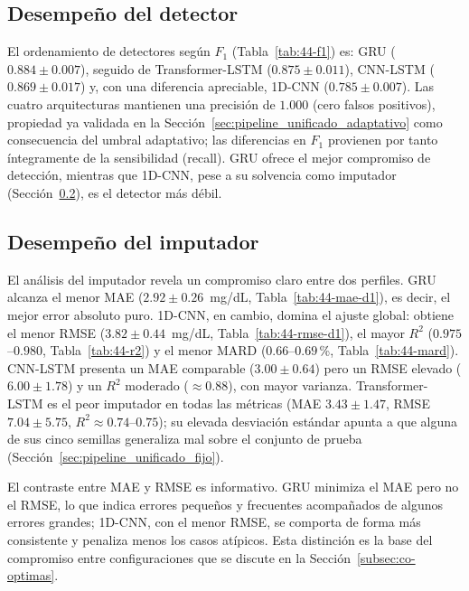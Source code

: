 \documentclass{report}
\begin{document}
\subsection{Desempeño del detector}
\label{subsec:detector-f1}

El ordenamiento de detectores según $F_1$ (Tabla~\ref{tab:44-f1}) es:
GRU ($0.884 \pm 0.007$), seguido de Transformer-LSTM ($0.875 \pm 0.011$),
CNN-LSTM ($0.869 \pm 0.017$) y, con una diferencia apreciable, 1D-CNN
($0.785 \pm 0.007$). Las cuatro arquitecturas mantienen una precisión de $1.000$ (cero falsos positivos), propiedad ya validada en la Sección~\ref{sec:pipeline_unificado_adaptativo} como consecuencia del umbral adaptativo; las diferencias en $F_1$ provienen por tanto íntegramente de la sensibilidad (recall). GRU ofrece el mejor compromiso de detección, mientras que 1D-CNN, pese a su solvencia como imputador (Sección~\ref{subsec:imputador}), es el detector más débil.

\subsection{Desempeño del imputador}
\label{subsec:imputador}

El análisis del imputador revela un compromiso claro entre dos perfiles. GRU alcanza el menor MAE ($2.92 \pm 0.26$~mg/dL, Tabla~\ref{tab:44-mae-d1}), es decir, el mejor error absoluto puro. 1D-CNN, en cambio, domina el ajuste global: obtiene el menor RMSE ($3.82 \pm 0.44$~mg/dL, Tabla~\ref{tab:44-rmse-d1}), el mayor $R^2$ ($0.975$–$0.980$, Tabla~\ref{tab:44-r2}) y el menor MARD ($0.66$–$0.69$\,\%, Tabla~\ref{tab:44-mard}). CNN-LSTM presenta un MAE comparable ($3.00 \pm 0.64$) pero un RMSE elevado ($6.00 \pm 1.78$) y un $R^2$ moderado ($\approx 0.88$), con mayor varianza. Transformer-LSTM es el peor imputador en todas las métricas (MAE $3.43 \pm 1.47$, RMSE $7.04 \pm 5.75$, $R^2 \approx 0.74$–$0.75$); su elevada desviación estándar apunta a que alguna de sus cinco semillas generaliza mal sobre el conjunto de prueba (Sección~\ref{sec:pipeline_unificado_fijo}).

El contraste entre MAE y RMSE es informativo. GRU minimiza el MAE pero no el RMSE, lo que indica errores pequeños y frecuentes acompañados de algunos errores grandes; 1D-CNN, con el menor RMSE, se comporta de forma más consistente y penaliza menos los casos atípicos. Esta distinción es la base del compromiso entre configuraciones que se discute en la Sección~\ref{subsec:co-optimas}.
\end{document}
